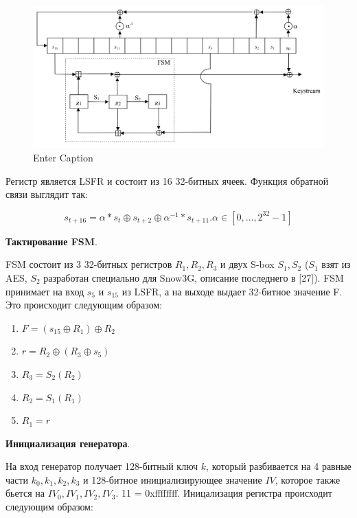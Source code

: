 \documentclass[colorthm]{./civarticle}
\begin{document}
\begin{figure}[H]
    \centering
    \includegraphics[width=1\linewidth]{Снимок экрана 2024-01-12 141248.png}
    \caption{Enter Caption}
    \label{fig:enter-label}
\end{figure}

Регистр является LSFR и состоит из 16 32-битных ячеек. Функция обратной связи выглядит так: 

\begin{equation}
    s_{t+16} = \alpha * s_t \oplus s_{t+2} \oplus \alpha^{-1}*s_{t+11}. \alpha \in [0, \dots, 2^{32}-1]
\end{equation}

\textbf{Тактирование FSM}. 

FSM состоит из 3 32-битных регистров $R_1, R_2, R_3$ и двух S-box $S_1, S_2$ ($S_1$ взят из AES, $S_2$ разработан специально для Snow3G, описание последнего в [27]). FSM принимает на вход $s_5$ и $s_{15}$ из LSFR, а на выходе выдает 32-битное значение F. Это происходит следующим образом: 

\begin{enumerate}
    \item $F = (s_{15} \oplus R_1) \oplus R_2$
    \item $r = R_2 \oplus (R_3 \oplus s_5)$
    \item $R_3 = S_2(R_2)$
    \item $R_2 = S_1(R_1)$
    \item $R_1 = r$
\end{enumerate}

\textbf{Инициализация генератора}.

На вход генератор получает 128-битный ключ $k$, который разбивается на 4 равные части $k_0, k_1, k_2, k_3$ и 128-битное инициализирующее значение $IV$, которое также бьется на $IV_0, IV_1, IV_2, IV_3$. 1\textbf{}{1} = 0xffffffff. Иницализация регистра происходит следующим образом:
\end{document}
